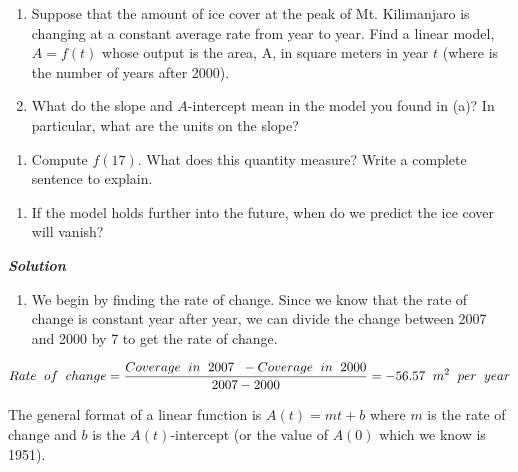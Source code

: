 \documentclass[
  letterpaper,
  DIV=11,
  numbers=noendperiod]{scrreprt}
\providecommand{\tightlist}{%
  \setlength{\itemsep}{0pt}\setlength{\parskip}{0pt}}\usepackage{longtable,booktabs,array}
\begin{document}
\begin{enumerate}
\def\labelenumi{\alph{enumi})}
\item
  Suppose that the amount of ice cover at the peak of Mt. Kilimanjaro is
  changing at a constant average rate from year to year. Find a linear
  model, \(A=f(t)\) whose output is the area, A, in square meters in
  year \(t\) (where is the number of years after 2000).
\item
  What do the slope and \(A\)-intercept mean in the model you found in
  (a)? In particular, what are the units on the slope?
\end{enumerate}

\begin{enumerate}
\def\labelenumi{\Alph{enumi})}
\setcounter{enumi}{2}
\tightlist
\item
  Compute \(f(17)\). What does this quantity measure? Write a complete
  sentence to explain.
\end{enumerate}

\begin{enumerate}
\def\labelenumi{\alph{enumi})}
\setcounter{enumi}{3}
\tightlist
\item
  If the model holds further into the future, when do we predict the ice
  cover will vanish?
\end{enumerate}

\textbf{\emph{Solution}}

\begin{enumerate}
\def\labelenumi{\alph{enumi})}
\tightlist
\item
  We begin by finding the rate of change. Since we know that the rate of
  change is constant year after year, we can divide the change between
  2007 and 2000 by 7 to get the rate of change.
\end{enumerate}

\[Rate\hspace{.08in} of\hspace{.08in} change =  \frac{Coverage \hspace{.08in} in \hspace{.08in} 2007 \hspace{.08in}- Coverage \hspace{.08in} in \hspace{.08in} 2000}{2007-2000}= - 56.57\hspace{.08in} m^2\hspace{.08in} per \hspace{.08in} year\]

The general format of a linear function is \(A(t)=mt+b\) where \(m\) is
the rate of change and \(b\) is the \(A(t)\)-intercept (or the value of
\(A(0)\) which we know is 1951).
\end{document}
